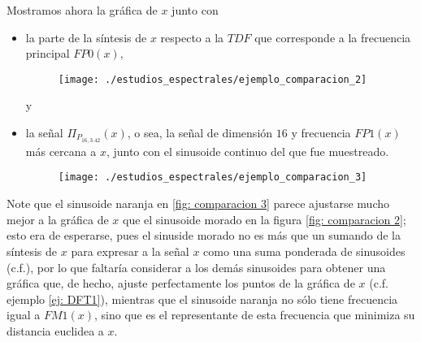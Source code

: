 \begin{ejemplo}
Mostramos ahora la gráfica de $x$ junto con
\begin{itemize}
	\item la parte de la síntesis de $x$ respecto a la $TDF$
	que corresponde a la frecuencia principal
	$FP0(x)$, 
	\begin{figure}[H]
			\sidecaption{
			\label{fig: comparacion 2}
			}
			\centering
			\texttt{[image: ./estudios\_espectrales/ejemplo\_comparacion\_2]} 
		\end{figure}		
	
	y
	\item la señal $\Pi_{P_{16, 3.42}}(x)$, o sea, la señal de
	dimensión $16$ y frecuencia $FP1(x)$ más cercana a $x$, junto con
	el sinusoide continuo del que fue muestreado.
	\begin{figure}[H]
			\centering
			\texttt{[image: ./estudios\_espectrales/ejemplo\_comparacion\_3]} 
		\end{figure}		
\end{itemize}


Note que el sinusoide naranja en 
\ref{fig: comparacion 3}
parece ajustarse mucho mejor a la gráfica de $x$
que el sinusoide morado en la figura 
\ref{fig: comparacion 2};
esto era de esperarse, pues
el sinuside morado no es más que un sumando 
de la síntesis de $x$ para expresar a la
señal $x$ como una suma ponderada de sinusoides
(c.f.), por lo que faltaría considerar
a los demás sinusoides para obtener una gráfica que, de hecho, ajuste
perfectamente los puntos de la gráfica de $x$
(c.f. ejemplo \ref{ej: DFT1}), mientras que el sinusoide
naranja no sólo tiene frecuencia igual a 
$FM1(x)$, sino que es el representante de esta 
frecuencia que minimiza su distancia euclidea a $x$.

\final
\end{ejemplo}